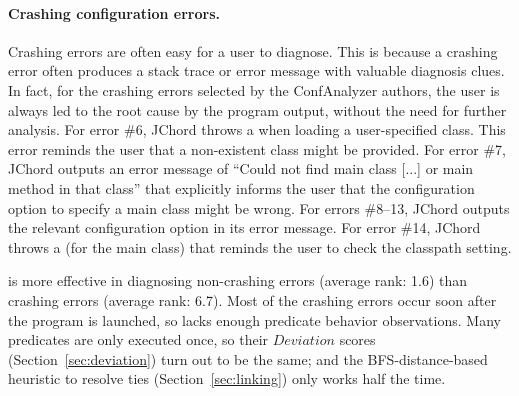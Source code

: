 
\paragraph{Crashing configuration errors.}

Crashing errors are often easy for a user to diagnose.
This is because a crashing error often produces a stack trace or error message with valuable diagnosis clues.
In fact, for the crashing errors selected by the ConfAnalyzer authors, the
user is always led to the root cause by the program output,
without the need for further analysis.
For error \#6, JChord throws a 
when loading a user-specified class. This error
reminds the user that a non-existent class might be provided.
For error \#7, JChord outputs an error message of ``Could not find main class [...]
or main method in that class'' that explicitly informs the user that
the configuration option to specify a main class might be wrong.
For errors \#8--13,
JChord outputs the relevant configuration option in its error message.
For error \#14, JChord throws a 
(for the main class) that reminds the user to check the classpath setting.  



\ourtool is more effective in diagnosing non-crashing errors (average
rank: 1.6) than crashing errors (average rank: 6.7).
Most of the crashing errors occur soon
after the program is launched, so \ourtool  lacks enough predicate behavior observations.  Many predicates are
only executed once, so their $Deviation$ scores
 (Section~\ref{sec:deviation}) turn out to be the same; and the
 BFS-distance-based heuristic to resolve ties (Section~\ref{sec:linking}) only
works half the time.



